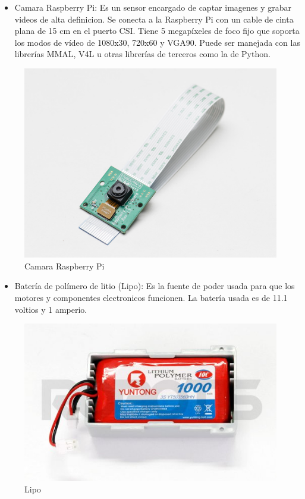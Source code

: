 \begin{itemize}
\item Camara Raspberry Pi: Es un sensor encargado de captar imagenes y grabar videos de alta definicion. Se conecta a la Raspberry Pi con un cable de cinta plana de 15 cm en el puerto CSI. Tiene 5 megapíxeles de foco fijo que soporta los modos de vídeo de 1080x30, 720x60 y VGA90. Puede ser manejada con las librerías MMAL, V4L u otras librerías de terceros como la de Python. %

\end{itemize}

\begin{figure}[hbtp]
\caption{Camara Raspberry Pi}
\centering
\includegraphics[scale=0.7]{imagenes/1367-01.jpg}
\end{figure}


\begin{itemize}
\item Batería de polímero de litio (Lipo): Es la fuente de poder usada para que los motores y componentes electronicos funcionen. La batería usada es de 11.1 voltios y 1 amperio. 
\end{itemize}


\begin{figure}[hbtp]
\caption{Lipo}
\centering
\includegraphics[scale=0.7]{imagenes/R-LIPOBAT.jpg}
\end{figure}

